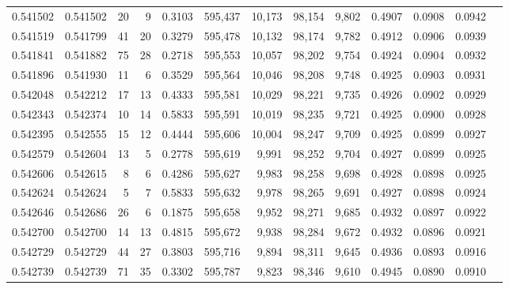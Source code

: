\begin{tabular}{rrrrrrrrrrrrr}
0.541502 & 0.541502 &    20 &     9 &                                     0.3103 & 595,437 &  10,173 &  98,154 &   9,802 & 0.4907 & 0.0908 & 0.0942 \\
0.541519 & 0.541799 &    41 &    20 &                                     0.3279 & 595,478 &  10,132 &  98,174 &   9,782 & 0.4912 & 0.0906 & 0.0939 \\
0.541841 & 0.541882 &    75 &    28 &                                     0.2718 & 595,553 &  10,057 &  98,202 &   9,754 & 0.4924 & 0.0904 & 0.0932 \\
0.541896 & 0.541930 &    11 &     6 &                                     0.3529 & 595,564 &  10,046 &  98,208 &   9,748 & 0.4925 & 0.0903 & 0.0931 \\
0.542048 & 0.542212 &    17 &    13 &                                     0.4333 & 595,581 &  10,029 &  98,221 &   9,735 & 0.4926 & 0.0902 & 0.0929 \\
0.542343 & 0.542374 &    10 &    14 &                                     0.5833 & 595,591 &  10,019 &  98,235 &   9,721 & 0.4925 & 0.0900 & 0.0928 \\
0.542395 & 0.542555 &    15 &    12 &                                     0.4444 & 595,606 &  10,004 &  98,247 &   9,709 & 0.4925 & 0.0899 & 0.0927 \\
0.542579 & 0.542604 &    13 &     5 &                                     0.2778 & 595,619 &   9,991 &  98,252 &   9,704 & 0.4927 & 0.0899 & 0.0925 \\
0.542606 & 0.542615 &     8 &     6 &                                     0.4286 & 595,627 &   9,983 &  98,258 &   9,698 & 0.4928 & 0.0898 & 0.0925 \\
0.542624 & 0.542624 &     5 &     7 &                                     0.5833 & 595,632 &   9,978 &  98,265 &   9,691 & 0.4927 & 0.0898 & 0.0924 \\
0.542646 & 0.542686 &    26 &     6 &                                     0.1875 & 595,658 &   9,952 &  98,271 &   9,685 & 0.4932 & 0.0897 & 0.0922 \\
0.542700 & 0.542700 &    14 &    13 &                                     0.4815 & 595,672 &   9,938 &  98,284 &   9,672 & 0.4932 & 0.0896 & 0.0921 \\
0.542729 & 0.542729 &    44 &    27 &                                     0.3803 & 595,716 &   9,894 &  98,311 &   9,645 & 0.4936 & 0.0893 & 0.0916 \\
0.542739 & 0.542739 &    71 &    35 &                                     0.3302 & 595,787 &   9,823 &  98,346 &   9,610 & 0.4945 & 0.0890 & 0.0910 \\

\end{tabular}
